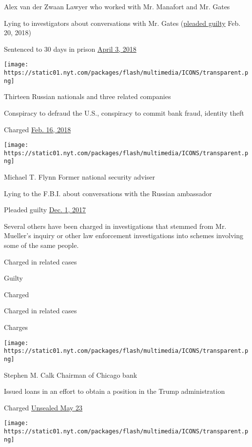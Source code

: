 Alex van der Zwaan Lawyer who worked with Mr. Manafort and Mr. Gates

Lying to investigators about conversations with Mr. Gates
(\href{https://www.nytimes.com/2018/02/20/us/politics/alex-van-der-zwaan-gates-russia-mueller.html}{pleaded
guilty} Feb. 20, 2018)

Sentenced to 30 days in prison
\href{https://www.nytimes.com/2018/04/03/us/alex-van-der-zwaan-sentencing-russia-investigation-mueller.html}{April
3, 2018}

\texttt{[image: https://static01.nyt.com/packages/flash/multimedia/ICONS/transparent.png]}

Thirteen Russian nationals and three related companies

Conspiracy to defraud the U.S., conspiracy to commit bank fraud,
identity theft

Charged
\href{https://www.nytimes.com/2018/02/16/us/politics/russians-indicted-mueller-election-interference.html}{Feb.
16, 2018}

\texttt{[image: https://static01.nyt.com/packages/flash/multimedia/ICONS/transparent.png]}

Michael T. Flynn Former national security adviser

Lying to the F.B.I. about conversations with the Russian ambassador

Pleaded guilty
\href{https://www.nytimes.com/2017/12/01/us/politics/michael-flynn-guilty-russia-investigation.html}{Dec.
1, 2017}

Several others have been charged in investigations that stemmed from Mr.
Mueller's inquiry or other law enforcement investigations into schemes
involving some of the same people.

Charged in related cases

Guilty

Charged

Charged in related cases

Charges

\texttt{[image: https://static01.nyt.com/packages/flash/multimedia/ICONS/transparent.png]}

Stephen M. Calk Chairman of Chicago bank

Issued loans in an effort to obtain a position in the Trump
administration

Charged
\href{https://www.nytimes.com/2019/05/23/nyregion/stephen-calk-manafort-arrest.html}{Unsealed
May 23}

\texttt{[image: https://static01.nyt.com/packages/flash/multimedia/ICONS/transparent.png]}

